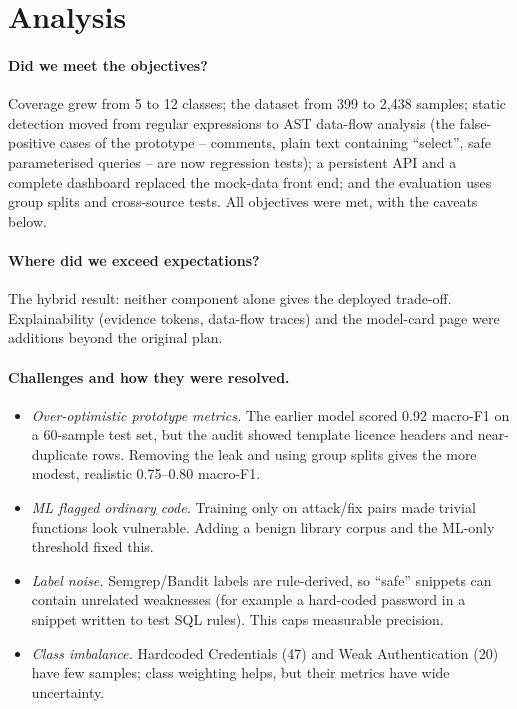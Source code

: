 \documentclass[11pt,a4paper,twoside]{report}
\begin{document}
\section{Analysis}
\label{sec:analysis}
\paragraph{Did we meet the objectives?} Coverage grew from 5 to 12 classes; the dataset from 399 to 2{,}438 samples; static detection moved from regular expressions to AST data-flow analysis (the false-positive cases of the prototype -- comments, plain text containing ``select'', safe parameterised queries -- are now regression tests); a persistent API and a complete dashboard replaced the mock-data front end; and the evaluation uses group splits and cross-source tests. All objectives were met, with the caveats below.

\paragraph{Where did we exceed expectations?} The hybrid result: neither component alone gives the deployed trade-off. Explainability (evidence tokens, data-flow traces) and the model-card page were additions beyond the original plan.

\paragraph{Challenges and how they were resolved.}
\begin{itemize}[noitemsep]
  \item \emph{Over-optimistic prototype metrics.} The earlier model scored 0.92 macro-F1 on a 60-sample test set, but the audit showed template licence headers and near-duplicate rows. Removing the leak and using group splits gives the more modest, realistic 0.75--0.80 macro-F1.
  \item \emph{ML flagged ordinary code.} Training only on attack/fix pairs made trivial functions look vulnerable. Adding a benign library corpus and the ML-only threshold fixed this.
  \item \emph{Label noise.} Semgrep/Bandit labels are rule-derived, so ``safe'' snippets can contain unrelated weaknesses (for example a hard-coded password in a snippet written to test SQL rules). This caps measurable precision.
  \item \emph{Class imbalance.} Hardcoded Credentials (47) and Weak Authentication (20) have few samples; class weighting helps, but their metrics have wide uncertainty.
\end{itemize}
\end{document}
